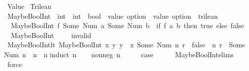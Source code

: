 %
\begin{isabellebody}%
%
%
\isadelimtheory
%
\endisadelimtheory
%
\isatagtheory
{}\isamarkupfalse%
\ Value\isanewline
{}\ Trilean\isanewline
{}%
\endisatagtheory
{\isafoldtheory}%
%
\isadelimtheory
%
\endisadelimtheory
%
\isamarkupfalse%
\ MaybeBoolInt\ {\isacharcolon}{\isacharcolon}\ {\isachardoublequoteopen}{\isacharparenleft}int\ {\isasymRightarrow}\ int\ {\isasymRightarrow}\ bool{\isacharparenright}\ {\isasymRightarrow}\ value\ option\ {\isasymRightarrow}\ value\ option\ {\isasymRightarrow}\ trilean{\isachardoublequoteclose}\ \isanewline
\ \ {\isachardoublequoteopen}MaybeBoolInt\ f\ {\isacharparenleft}Some\ {\isacharparenleft}Num\ a{\isacharparenright}{\isacharparenright}\ {\isacharparenleft}Some\ {\isacharparenleft}Num\ b{\isacharparenright}{\isacharparenright}\ {\isacharequal}\ {\isacharparenleft}if\ f\ a\ b\ then\ true\ else\ false{\isacharparenright}{\isachardoublequoteclose}\ {\isacharbar}\isanewline
\ \ {\isachardoublequoteopen}MaybeBoolInt\ {\isacharunderscore}\ {\isacharunderscore}\ {\isacharunderscore}\ {\isacharequal}\ invalid{\isachardoublequoteclose}\isanewline
\isanewline
{}\isamarkupfalse%
\ MaybeBoolInt{\isacharunderscore}lt{\isacharcolon}\ {\isachardoublequoteopen}MaybeBoolInt\ {\isacharparenleft}{\isasymlambda}x\ y{\isachardot}\ y\ {\isacharless}\ x{\isacharparenright}\ {\isacharparenleft}Some\ {\isacharparenleft}Num\ n{\isacharprime}{\isacharparenright}{\isacharparenright}\ r\ {\isacharequal}\ false\ {\isasymLongrightarrow}\ {\isasymexists}n{\isachardot}\ r\ {\isacharequal}\ Some\ {\isacharparenleft}Num\ n{\isacharparenright}\ {\isasymand}\ n{\isacharprime}\ {\isasymle}\ n{\isachardoublequoteclose}\isanewline
%
\isadelimproof
%
\endisadelimproof
%
\isatagproof
{}\isamarkupfalse%
{\isacharparenleft}induct\ n{\isacharprime}{\isacharparenright}\isanewline
\ \ \isamarkupfalse%
\ {\isacharparenleft}nonneg\ n{\isacharparenright}\isanewline
\ \ \isamarkupfalse%
\ \isamarkupfalse%
\ {\isacharquery}case\isanewline
\ \ \ \ \isamarkupfalse%
\ MaybeBoolInt{\isachardot}elims\ \isamarkupfalse%
\ force\isanewline
{}\isamarkupfalse%
\isanewline
\ \ \isamarkupfalse%

\end{isabellebody}
